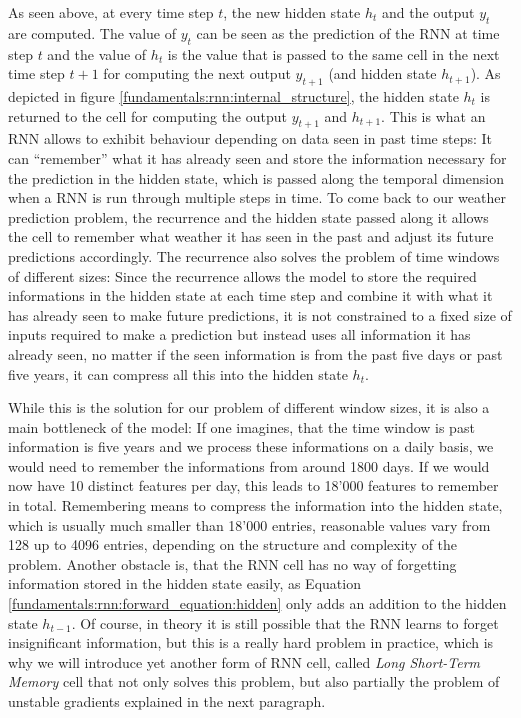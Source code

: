 As seen above, at every time step $t$, the new hidden state $h_t$ and the output $y_t$ are computed. The value of $y_t$ can be seen as the prediction of the RNN at time step $t$ and the value of $h_t$ is the value that is passed to the same cell in the next time step $t+1$ for computing the next output $y_{t+1}$ (and hidden state $h_{t+1}$). As depicted in figure \ref{fundamentals:rnn:internal_structure}, the hidden state $h_t$ is returned to the cell for computing the output $y_{t+1}$ and $h_{t+1}$. This is what an RNN allows to exhibit behaviour depending on data seen in past time steps: It can ``remember'' what it has already seen and store the information necessary for the prediction in the hidden state, which is passed along the temporal dimension when a RNN is run through multiple steps in time.
To come back to our weather prediction problem, the recurrence and the hidden state passed along it allows the cell to remember what weather it has seen in the past and adjust its future predictions accordingly. The recurrence also solves the problem of time windows of different sizes: Since the recurrence allows the model to store the required informations in the hidden state at each time step and combine it with what it has already seen to make future predictions, it is not constrained to a fixed size of inputs required to make a prediction but instead uses all information it has already seen, no matter if the seen information is from the past five days or past five years, it can compress all this into the hidden state $h_t$.

While this is the solution for our problem of different window sizes, it is also a main bottleneck of the model: If one imagines, that the time window is past information is five years and we process these informations on a daily basis, we would need to remember the informations from around 1800 days. If we would now have 10 distinct features per day, this leads to 18'000 features to remember in total. Remembering means to compress the information into the hidden state, which is usually much smaller than 18'000 entries, reasonable values vary from 128 up to 4096 entries, depending on the structure and complexity of the problem. Another obstacle is, that the RNN cell has no way of forgetting information stored in the hidden state easily, as Equation \ref{fundamentals:rnn:forward_equation:hidden} only adds an addition to the hidden state $h_{t-1}$. Of course, in theory it is still possible that the RNN learns to forget insignificant information, but this is a really hard problem in practice, which is why we will introduce yet another form of RNN cell, called \emph{Long Short-Term Memory} cell that  not only solves this problem, but also partially the problem of unstable gradients explained in the next paragraph.

